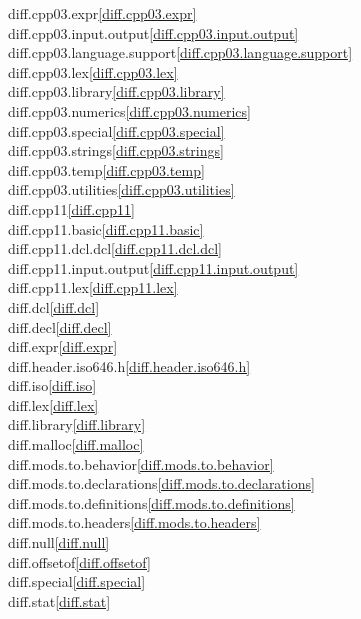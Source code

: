 \begin{multicols}{2}
diff.cpp03.expr\quad\ref{diff.cpp03.expr}\\
diff.cpp03.input.output\quad\ref{diff.cpp03.input.output}\\
diff.cpp03.language.support\quad\ref{diff.cpp03.language.support}\\
diff.cpp03.lex\quad\ref{diff.cpp03.lex}\\
diff.cpp03.library\quad\ref{diff.cpp03.library}\\
diff.cpp03.numerics\quad\ref{diff.cpp03.numerics}\\
diff.cpp03.special\quad\ref{diff.cpp03.special}\\
diff.cpp03.strings\quad\ref{diff.cpp03.strings}\\
diff.cpp03.temp\quad\ref{diff.cpp03.temp}\\
diff.cpp03.utilities\quad\ref{diff.cpp03.utilities}\\
diff.cpp11\quad\ref{diff.cpp11}\\
diff.cpp11.basic\quad\ref{diff.cpp11.basic}\\
diff.cpp11.dcl.dcl\quad\ref{diff.cpp11.dcl.dcl}\\
diff.cpp11.input.output\quad\ref{diff.cpp11.input.output}\\
diff.cpp11.lex\quad\ref{diff.cpp11.lex}\\
diff.dcl\quad\ref{diff.dcl}\\
diff.decl\quad\ref{diff.decl}\\
diff.expr\quad\ref{diff.expr}\\
diff.header.iso646.h\quad\ref{diff.header.iso646.h}\\
diff.iso\quad\ref{diff.iso}\\
diff.lex\quad\ref{diff.lex}\\
diff.library\quad\ref{diff.library}\\
diff.malloc\quad\ref{diff.malloc}\\
diff.mods.to.behavior\quad\ref{diff.mods.to.behavior}\\
diff.mods.to.declarations\quad\ref{diff.mods.to.declarations}\\
diff.mods.to.definitions\quad\ref{diff.mods.to.definitions}\\
diff.mods.to.headers\quad\ref{diff.mods.to.headers}\\
diff.null\quad\ref{diff.null}\\
diff.offsetof\quad\ref{diff.offsetof}\\
diff.special\quad\ref{diff.special}\\
diff.stat\quad\ref{diff.stat}\\

\end{multicols}
